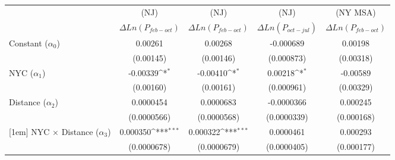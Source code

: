 {
\def\sym#1{\ifmmode^{#1}\else\(^{#1}\)\fi}
\begin{tabular}{l*{4}{c}}
\hline\hline
                    &\multicolumn{1}{c}{(NJ)}&\multicolumn{1}{c}{(NJ)}&\multicolumn{1}{c}{(NJ)}&\multicolumn{1}{c}{(NY MSA)}\\
                    &\multicolumn{1}{c}{$\Delta Ln(P_{feb-oct})$}&\multicolumn{1}{c}{$\Delta Ln(P_{feb-oct})$}&\multicolumn{1}{c}{$\Delta Ln(P_{oct-jul})$}&\multicolumn{1}{c}{$\Delta Ln(P_{feb-oct})$}\\
\hline
Constant ($ \alpha_0 $)           &     0.00261         &     0.00268         &   -0.000689         &     0.00198         \\
                    &   (0.00145)         &   (0.00146)         &  (0.000873)         &   (0.00318)        \\
        [1em]
NYC ($ \alpha_1 $)     &    -0.00339\sym{*}  &    -0.00410\sym{*}  &     0.00218\sym{*}  &       -0.00589              \\
                    &   (0.00160)         &   (0.00161)         &  (0.000961)         &                     (0.00329)   \\
[1em]
Distance   ($\alpha_2$)            &   0.0000454         &   0.0000683         &  -0.0000366         &                      0.000245         \\
                    & (0.0000566)         & (0.0000568)         & (0.0000339)         &                     (0.000168)      \\
[1em]
NYC $\times$ Distance ($\alpha_3$)    &    0.000350\sym{***}&    0.000322\sym{***}&   0.0000461         &     0.000293                 \\
                    & (0.0000678)         & (0.0000679)         & (0.0000405)         &                     (0.000177)   \\

\end{tabular}}
